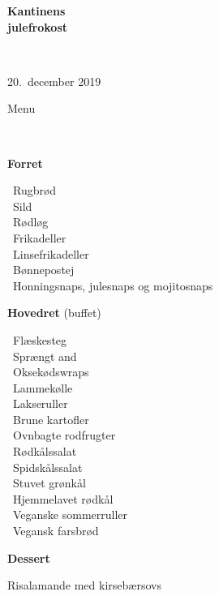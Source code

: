 \begin{center}
\begin{HUGE}
\textbf{Kantinens \\[3mm] julefrokost}
\end{HUGE}
\\[.6cm]
\begin{Large}
20.~december 2019
\end{Large}
\end{center}
\vspace*{.01cm}
\begin{center}
\begin{huge}
Menu
\end{huge}
\\[.1cm]
\end{center}
\newcommand{\course}[1]{\vspace*{4mm} \textbf{#1} \vspace{-7mm}}
\newcommand{\goodindent}{\null\hspace{23mm}}
{\small
\vspace{-0.5cm}
\begin{center}
\course{Forret}
\end{center}
  \goodindent~Rugbrød
\\\goodindent~Sild
\\\goodindent~Rødløg
\\\goodindent~Frikadeller
\\\goodindent~Linsefrikadeller
\\\goodindent~Bønnepostej
\\\goodindent~Honningsnaps, julesnaps og mojitosnaps

\begin{center}
\vspace{-0.2cm}
\course{Hovedret} (buffet)
\end{center}
  \goodindent~Flæskesteg
\\\goodindent~Sprængt and
\\\goodindent~Oksekødswraps
\\\goodindent~Lammekølle
\\\goodindent~Lakseruller
\\\goodindent~Brune kartofler
\\\goodindent~Ovnbagte rodfrugter
\\\goodindent~Rødkålssalat
\\\goodindent~Spidskålssalat
\\\goodindent~Stuvet grønkål
\\\goodindent~Hjemmelavet rødkål
\\\goodindent~Veganske sommerruller
\\\goodindent~Vegansk farsbrød

\begin{center}
\vspace{-0.2cm}
\course{Dessert}
\end{center}
  \goodindent Risalamande med kirsebærsovs
}
